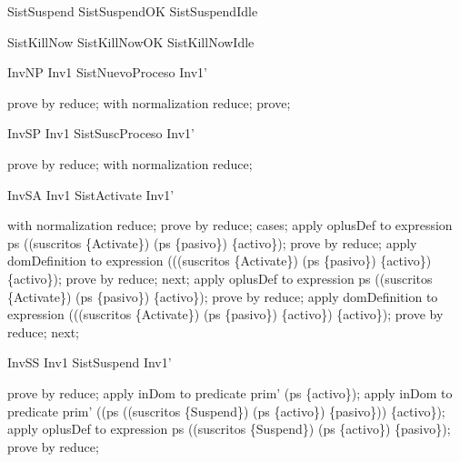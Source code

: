 \begin{zed}
SistSuspend  SistSuspendOK \lor  SistSuspendIdle
\end{zed}

\begin{zed}
SistKillNow  SistKillNowOK \lor  SistKillNowIdle
\end{zed}

\begin{theorem}{InvNP}
Inv1 \land  SistNuevoProceso \implies  Inv1'
\end{theorem}

\begin{zproof}[InvNP]
prove by reduce;
with normalization reduce;
prove;
\end{zproof}

\begin{theorem}{InvSP}
Inv1 \land  SistSuscProceso \implies  Inv1'
\end{theorem}

\begin{zproof}[InvSP]
prove by reduce;
with normalization reduce;
\end{zproof}

\begin{theorem}{InvSA}
Inv1 \land  SistActivate \implies  Inv1'
\end{theorem}

\begin{zproof}[InvSA]
with normalization reduce;
prove by reduce;
cases;
apply oplusDef to expression ps \oplus  (\dom  (suscritos \rres  \{Activate\}) \cap  \dom  (ps \rres  \{pasivo\}) \cross  \{activo\});
prove by reduce;
apply domDefinition to expression \dom  ((\dom  (suscritos \rres  \{Activate\}) \cap  \dom  (ps \rres  \{pasivo\}) \cross  \{activo\}) \rres  \{activo\});
prove by reduce;
next;
apply oplusDef to expression ps \oplus  (\dom  (suscritos \rres  \{Activate\}) \cap  \dom  (ps \rres  \{pasivo\}) \cross  \{activo\});
prove by reduce;
apply domDefinition to expression \dom  ((\dom  (suscritos \rres  \{Activate\}) \cap  \dom  (ps \rres  \{pasivo\}) \cross  \{activo\}) \rres  \{activo\});
prove by reduce;
next;
\end{zproof}

\begin{theorem}{InvSS}
Inv1 \land  SistSuspend \implies  Inv1'
\end{theorem}

\begin{zproof}[InvSS]
prove by reduce;
apply inDom to predicate prim' \in  \dom  (ps \rres  \{activo\});
apply inDom to predicate prim' \in  \dom  ((ps \oplus  (\dom  (suscritos \rres  \{Suspend\}) \cap  \dom  (ps \rres  \{activo\}) \cross  \{pasivo\})) \rres  \{activo\});
apply oplusDef to expression ps \oplus  (\dom  (suscritos \rres  \{Suspend\}) \cap  \dom  (ps \rres  \{activo\}) \cross  \{pasivo\});
prove by reduce;
\end{zproof}

